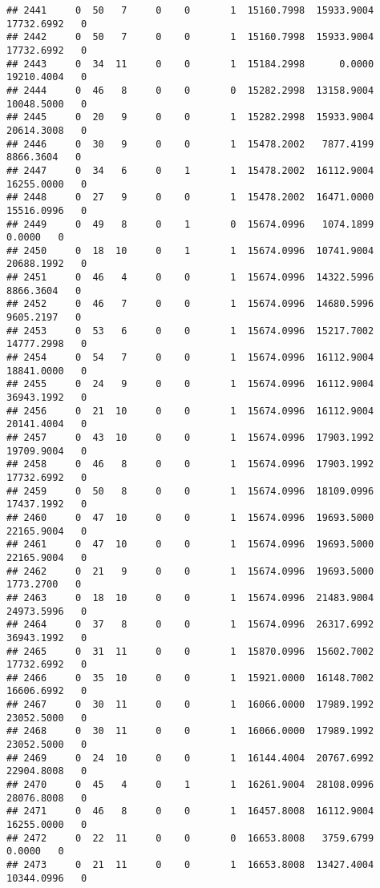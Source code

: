 \documentclass[
]{article}
\begin{document}
\begin{enumerate}
\begin{verbatim}
## 2441     0  50   7     0    0       1  15160.7998  15933.9004  17732.6992   0
## 2442     0  50   7     0    0       1  15160.7998  15933.9004  17732.6992   0
## 2443     0  34  11     0    0       1  15184.2998      0.0000  19210.4004   0
## 2444     0  46   8     0    0       0  15282.2998  13158.9004  10048.5000   0
## 2445     0  20   9     0    0       1  15282.2998  15933.9004  20614.3008   0
## 2446     0  30   9     0    0       1  15478.2002   7877.4199   8866.3604   0
## 2447     0  34   6     0    1       1  15478.2002  16112.9004  16255.0000   0
## 2448     0  27   9     0    0       1  15478.2002  16471.0000  15516.0996   0
## 2449     0  49   8     0    1       0  15674.0996   1074.1899      0.0000   0
## 2450     0  18  10     0    1       1  15674.0996  10741.9004  20688.1992   0
## 2451     0  46   4     0    0       1  15674.0996  14322.5996   8866.3604   0
## 2452     0  46   7     0    0       1  15674.0996  14680.5996   9605.2197   0
## 2453     0  53   6     0    0       1  15674.0996  15217.7002  14777.2998   0
## 2454     0  54   7     0    0       1  15674.0996  16112.9004  18841.0000   0
## 2455     0  24   9     0    0       1  15674.0996  16112.9004  36943.1992   0
## 2456     0  21  10     0    0       1  15674.0996  16112.9004  20141.4004   0
## 2457     0  43  10     0    0       1  15674.0996  17903.1992  19709.9004   0
## 2458     0  46   8     0    0       1  15674.0996  17903.1992  17732.6992   0
## 2459     0  50   8     0    0       1  15674.0996  18109.0996  17437.1992   0
## 2460     0  47  10     0    0       1  15674.0996  19693.5000  22165.9004   0
## 2461     0  47  10     0    0       1  15674.0996  19693.5000  22165.9004   0
## 2462     0  21   9     0    0       1  15674.0996  19693.5000   1773.2700   0
## 2463     0  18  10     0    0       1  15674.0996  21483.9004  24973.5996   0
## 2464     0  37   8     0    0       1  15674.0996  26317.6992  36943.1992   0
## 2465     0  31  11     0    0       1  15870.0996  15602.7002  17732.6992   0
## 2466     0  35  10     0    0       1  15921.0000  16148.7002  16606.6992   0
## 2467     0  30  11     0    0       1  16066.0000  17989.1992  23052.5000   0
## 2468     0  30  11     0    0       1  16066.0000  17989.1992  23052.5000   0
## 2469     0  24  10     0    0       1  16144.4004  20767.6992  22904.8008   0
## 2470     0  45   4     0    1       1  16261.9004  28108.0996  28076.8008   0
## 2471     0  46   8     0    0       1  16457.8008  16112.9004  16255.0000   0
## 2472     0  22  11     0    0       0  16653.8008   3759.6799      0.0000   0
## 2473     0  21  11     0    0       1  16653.8008  13427.4004  10344.0996   0

\end{verbatim}
\end{enumerate}
\end{document}
